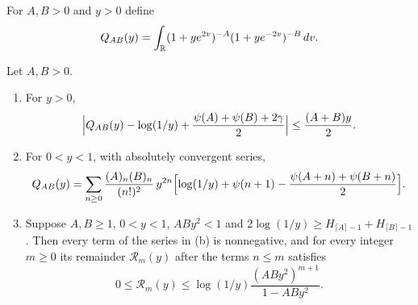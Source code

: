 For $A,B>0$ and $y>0$ define
\[
 Q_{AB}(y)=\int_\mathbb R(1+ye^{2v})^{-A}(1+ye^{-2v})^{-B}\,dv .
\]

\begin{lemma}\label{pf:hyperbola}
Let $A,B>0$.
\begin{enumerate}
\item[(a)] For $y>0$,
\begin{equation}\label{pf:elementary-hyperbola-error}
 \Bigl|Q_{AB}(y)-\log(1/y)+\frac{\psi(A)+\psi(B)+2\gamma}{2}\Bigr|
 \le\frac{(A+B)y}2 .
\end{equation}
\item[(b)] For $0<y<1$, with absolutely convergent series,
\[
 Q_{AB}(y)=\sum_{n\ge0}\frac{(A)_n(B)_n}{(n!)^2}\,y^{2n}
 \Bigl[\log(1/y)+\psi(n+1)-\frac{\psi(A+n)+\psi(B+n)}2\Bigr].
\]
\item[(c)] Suppose $A,B\ge1$, $0<y<1$, $ABy^2<1$ and
$2\log(1/y)\ge H_{\lceil A\rceil-1}+H_{\lceil B\rceil-1}$. Then every
term of the series in (b) is nonnegative, and for every integer $m\ge0$
its remainder $\mathcal R_m(y)$ after the terms $n\le m$ satisfies
\[
 0\le\mathcal R_m(y)\le\log(1/y)\frac{(ABy^2)^{m+1}}{1-ABy^2}.
\]
\end{enumerate}
\end{lemma}


